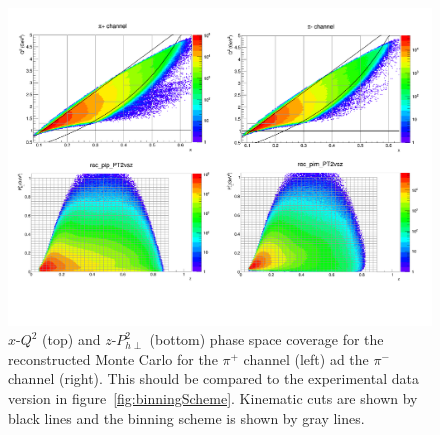 %
\begin{figure}[htp]
\centering
\includegraphics[width=5in]{figures/phaseSpaceCoverage_recMC.pdf}
\caption{$x$-$Q^2$ (top) and $z$-$P_{h\perp}^2$ (bottom) phase space coverage for the reconstructed Monte Carlo for the $\pi^+$ channel (left) ad the $\pi^-$ channel (right). This should be compared to the experimental data version in figure~\ref{fig:binningScheme}. Kinematic cuts are shown by black lines and the binning scheme is shown by gray lines.}
\label{fig:phaseSpaceCoverage_recMC}
\end{figure}
%

%

\clearpage %

